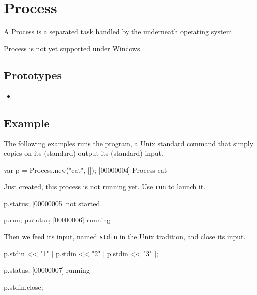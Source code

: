 
\section{Process}

A Process is a separated task handled by the underneath operating
system.

\begin{windows}
  Process is not yet supported under Windows.
\end{windows}

\subsection{Prototypes}
\begin{itemize}
\item {}
\end{itemize}

\subsection{Example}

The following examples runs the  program, a Unix standard
command that simply copies on its (standard) output its (standard)
input.

\begin{urbiscript}
var p = Process.new("cat", []);
[00000004] Process cat
\end{urbiscript}

\noindent
Just created, this process is not running yet.  Use \lstinline|run| to
launch it.

\begin{urbiscript}
p.status;
[00000005] not started

p.run;
p.status;
[00000006] running
\end{urbiscript}

\noindent
Then we feed its input, named \lstinline|stdin| in the Unix
tradition, and close its input.

\begin{urbiscript}
p.stdin << "1\n" |
p.stdin << "2\n" |
p.stdin << "3\n" |;

p.status;
[00000007] running

p.stdin.close;
\end{urbiscript}

